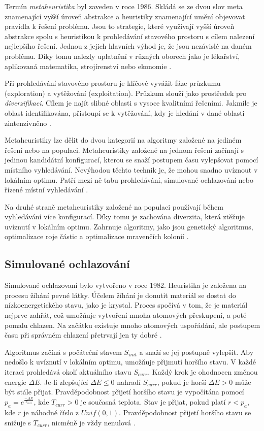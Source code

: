 Termín \textit{metaheuristika} byl zaveden v roce 1986.
Skládá se ze dvou slov meta znamenající vyšší úroveň abstrakce a heuristiky znamenající umění objevovat pravidla k řešení problému.
Jsou to strategie, které využívají vyšší úroveň abstrakce spolu s heuristikou k prohledávání stavového prostoru s cílem nalezení nejlepšího řešení.
Jednou z jejich hlavních výhod je, že jsou nezávislé na daném problému.
Díky tomu nalezly uplatnění v různých oborech jako je lékařství, aplikovaná matematika, strojírenství nebo ekonomie \cite{kaveh, peres}.

Při prohledávání stavového prostoru je klíčové vyvážit fáze průzkumu (exploration) a vytěžování (exploitation).
Průzkum slouží jako prostředek pro \textit{diverzifikaci}.
Cílem je najít slibné oblasti s vysoce kvalitními řešeními.
Jakmile je oblast identifikována, přistoupí se k vytěžování, kdy je hledání v dané oblasti zintenzivněno \cite{peres}.

Metaheuristiky lze dělit do dvou kategorií na algoritmy založené na jediném řešení nebo na populaci.
Metaheuristiky založené na jednom řešení začínají s jedinou kandidátní konfigurací, kterou se snaží postupem času vylepšovat pomocí místního vyhledávání.
Nevýhodou těchto technik je, že mohou snadno uvíznout v lokálním optimu.
Patří mezi ně tabu prohledávání, simulované ochlazování nebo řízené místní vyhledávání \cite{katoch}.

Na druhé straně metaheuristiky založené na populaci používají během vyhledávání více konfigurací.
Díky tomu je zachována diverzita, která ztěžuje uvíznutí v lokálním optimu.
Zahrnuje algoritmy, jako jsou genetický algoritmus, optimalizace roje částic a optimalizace mravenčích kolonií \cite{katoch}.

\subsection{Simulované ochlazování}
Simulované ochlazovaní bylo vytvořeno v roce 1982.
Heuristika je založena na procesu žíhání pevné látky.
Účelem žíhání je donutit materiál se dostat do nízkoenergetického stavu, jako je krystal.
Proces spočívá v tom, že je materiál nejprve zahřát, což umožňuje vytvoření mnoha atomových přeskupení, a poté pomalu chlazen.
Na začátku existuje mnoho atomových uspořádání, ale postupem času při správném chlazení přetrvají jen ty dobré \cite{rutenbar}.

Algoritmus začíná s počáteční stavem $S_{init}$ a snaží se jej postupně vylepšit.
Aby nedošlo k uvíznutí v lokálním optimu, umožňuje přijmutí horšího stavu.
V každé iteraci prohledává okolí aktuálního stavu $S_{curr}$.
Každý krok je ohodnocen změnou energie $\Delta E$.
Je-li zlepšující $\Delta E\leq0$ nahradí $S_{curr}$, pokud je horší $\Delta E>0$ může být stále přijat.
Pravděpodobnost přijetí horšího stavu je  vypočítána pomocí $p_a = e^{\frac{-\Delta E}{T_{curr}}}$, kde $T_{curr}>0$ je současná teplota.
Stav je přijat, pokud platí $r<p_a$, kde $r$ je náhodné číslo z $ Unif(0, 1)$.
Pravděpodobnost přijetí horšího stavu se snižuje s $T_{curr}$, nicméně je vždy nenulová \cite{rutenbar, kirkpatrik}.

